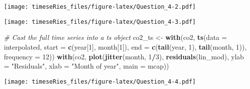 \documentclass[]{book}
\newenvironment{Shaded}{\begin{snugshade}}{\end{snugshade}}
\newcommand{\CommentTok}[1]{\textcolor[rgb]{0.56,0.35,0.01}{\textit{#1}}}
\newcommand{\DataTypeTok}[1]{\textcolor[rgb]{0.13,0.29,0.53}{#1}}
\newcommand{\DecValTok}[1]{\textcolor[rgb]{0.00,0.00,0.81}{#1}}
\newcommand{\KeywordTok}[1]{\textcolor[rgb]{0.13,0.29,0.53}{\textbf{#1}}}
\newcommand{\NormalTok}[1]{#1}
\newcommand{\OperatorTok}[1]{\textcolor[rgb]{0.81,0.36,0.00}{\textbf{#1}}}
\newcommand{\StringTok}[1]{\textcolor[rgb]{0.31,0.60,0.02}{#1}}
\begin{document}
\texttt{[image: timeseRies\_files/figure-latex/Question\_4-2.pdf]}

\begin{Shaded}
\end{Shaded}

\texttt{[image: timeseRies\_files/figure-latex/Question\_4-3.pdf]}

\begin{Shaded}
\begin{Highlighting}[]
\CommentTok{# Cast the full time series into a ts object}
\NormalTok{co2_ts <-}\StringTok{ }\KeywordTok{with}\NormalTok{(co2, }\KeywordTok{ts}\NormalTok{(}\DataTypeTok{data =}\NormalTok{ interpolated, }\DataTypeTok{start =} \KeywordTok{c}\NormalTok{(year[}\DecValTok{1}\NormalTok{], month[}\DecValTok{1}\NormalTok{]), }\DataTypeTok{end =} \KeywordTok{c}\NormalTok{(}\KeywordTok{tail}\NormalTok{(year, }
    \DecValTok{1}\NormalTok{), }\KeywordTok{tail}\NormalTok{(month, }\DecValTok{1}\NormalTok{)), }\DataTypeTok{frequency =} \DecValTok{12}\NormalTok{))}
\KeywordTok{with}\NormalTok{(co2, }\KeywordTok{plot}\NormalTok{(}\KeywordTok{jitter}\NormalTok{(month, }\DecValTok{1}\OperatorTok{/}\DecValTok{3}\NormalTok{), }\KeywordTok{residuals}\NormalTok{(lin_mod), }\DataTypeTok{ylab =} \StringTok{"Residuals"}\NormalTok{, }\DataTypeTok{xlab =} \StringTok{"Month of year"}\NormalTok{, }
    \DataTypeTok{main =}\NormalTok{ mcap))}
\end{Highlighting}
\end{Shaded}

\texttt{[image: timeseRies\_files/figure-latex/Question\_4-4.pdf]}
\end{document}
